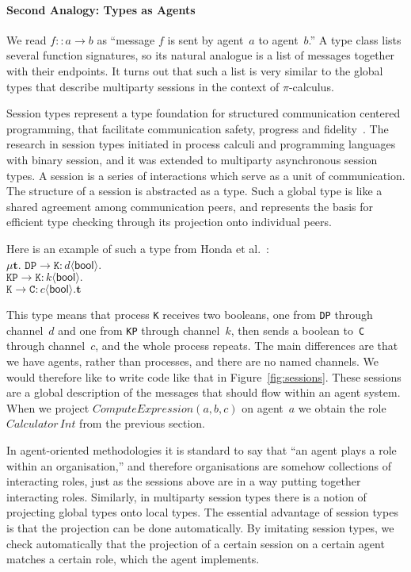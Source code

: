 \documentclass[a4paper,12pt,oneside,fleqn]{book} %
\begin{document}
{\def\l#1->#2:#3<#4>{\mathtt{#1}\to\mathtt{#2}:#3\langle\mathsf{#4}\rangle}
\paragraph{Second Analogy: Types as Agents} We read $f::a\to b$ as
``message $f$ is sent by agent~$a$ to agent~$b$.'' A type class lists
several function signatures, so its natural analogue is a list of messages
together with their endpoints. It turns out that such a list is very
similar to the global types that describe multiparty sessions in the
context of $\pi$-calculus.

Session types represent a type foundation for structured communication
centered programming, that facilitate communication safety, progress and
fidelity~\cite{dblp:conf/popl/hondayc08}. The research in session types
initiated in process calculi and programming languages with binary session,
and it was extended to multiparty asynchronous session types. A session is
a series of interactions which serve as a unit of communication. The
structure of a session is abstracted as a type. Such a global type is like
a shared agreement among communication peers, and represents the basis for
efficient type checking through its projection onto individual peers.



Here is an example of such a type from
Honda et al.~\cite{dblp:conf/popl/hondayc08}:\\
$\mu\mathbf{t}.$
  $\l DP->K:d<bool>. $\\
  $\l KP->K:k<bool>. $\\
  $\l K->C:c<bool>.\mathbf{t}$

This type means that process \texttt{K} receives two booleans, one from
\texttt{DP} through channel~$d$ and one from \texttt{KP} through channel~$k$,
then sends a boolean to~\texttt{C} through channel~$c$, and the whole process
repeats. The main differences are that we have agents, rather than processes,
and there are no named channels. We would therefore like to write code like
that in Figure~\ref{fig:sessions}.  These sessions are a global description of
the messages that should flow within an agent system. When we project
$\mathit{ComputeExpression}(a,b,c)$ on agent~$a$ we obtain the role
$\mathit{Calculator}\,\mathit{Int}$ from the previous section.}

In agent-oriented methodologies it is standard to say that ``an agent plays
a role within an organisation,'' and therefore organisations are somehow
collections of interacting roles, just as the sessions above are in a way
putting together interacting roles. Similarly, in multiparty session types
there is a notion of projecting global types onto local types. The
essential advantage of session types is that the projection can be done
automatically. By imitating session types, we check automatically that the
projection of a certain session on a certain agent matches a certain role,
which the agent implements.
\end{document}
